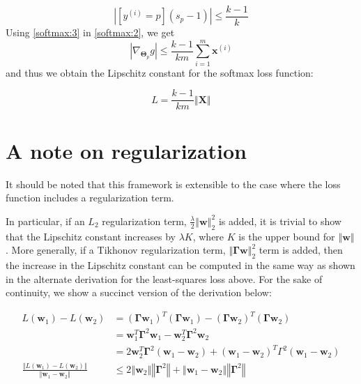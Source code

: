 \documentclass[sigconf,authordraft]{acmart}
\begin{document}
\begin{equation}
    |[y^{(i)} = p](s_p-1)| \leq \frac{k-1}{k} \label{softmax:3}
\end{equation}
Using \eqref{softmax:3} in \eqref{softmax:2}, we get
\[
    |\nabla_{\boldsymbol\Theta_p} g| \leq \frac{k-1}{km} \sum\limits_{i=1}^m \textbf{x}^{(i)}
\]
and thus we obtain the Lipschitz constant for the softmax loss function:

\[
    \boxed{
        L = \frac{k-1}{km}\left\Vert \textbf{X} \right\Vert
    }
\]

\section{A note on regularization} \label{regularization}
It should be noted that this framework is extensible to the case where the loss function includes a regularization term. 

In particular, if an $L_2$ regularization term, $\frac{\lambda}{2}\left\Vert \textbf{w} \right\Vert_2^2$ is added, it is trivial to show that the Lipschitz constant increases by $\lambda K$, where $K$ is the upper bound for $\left\Vert \textbf{w} \right\Vert$. More generally, if a Tikhonov regularization term, $\left\Vert \boldsymbol\Gamma \textbf{w} \right\Vert_2^2$ term is added, then the increase in the Lipschitz constant can be computed in the same way as shown in the alternate derivation for the least-squares loss above. For the sake of continuity, we show a succinct version of the derivation below:

\[
    \begin{aligned}
        L(\textbf{w}_1) - L(\textbf{w}_2) &= (\boldsymbol\Gamma \textbf{w}_1)^T (\boldsymbol\Gamma \textbf{w}_1) - (\boldsymbol\Gamma \textbf{w}_2)^T (\boldsymbol\Gamma \textbf{w}_2) \\
        &= \textbf{w}_1^T \boldsymbol\Gamma^2 \textbf{w}_1 - \textbf{w}_2^T \boldsymbol\Gamma^2 \textbf{w}_2 \\
        &= 2\textbf{w}_2^T \boldsymbol\Gamma^2 (\textbf{w}_1 - \textbf{w}_2) + (\textbf{w}_1-\textbf{w}_2)^T \Gamma^2 (\textbf{w}_1-\textbf{w}_2) \\
        \frac{\left\Vert L(\textbf{w}_1) - L(\textbf{w}_2) \right\Vert}{\left\Vert \textbf{w}_1-\textbf{w}_2 \right\Vert} & \leq 2 \left\Vert \textbf{w}_2 \right\Vert \left\Vert \boldsymbol\Gamma^2 \right\Vert + \left\Vert \textbf{w}_1-\textbf{w}_2 \right\Vert \left\Vert \boldsymbol\Gamma^2 \right\Vert 
    \end{aligned}
\]
\end{document}
